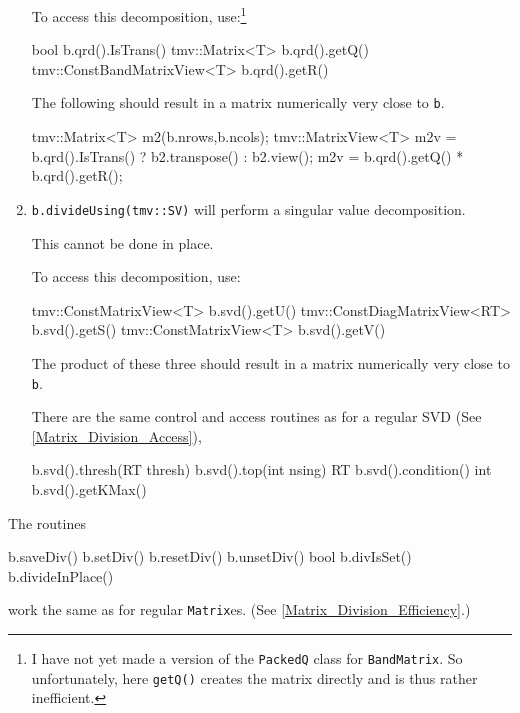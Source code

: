 \documentclass[twoside,letterpaper,11pt]{article}
\renewcommand{\tt}[1]{{\lstinline {#1}}}
\begin{document}
\begin{enumerate}
To access this decomposition, use:\footnote{
I have not yet made a version of the \tt{PackedQ} class for \tt{BandMatrix}.
So unfortunately, here \tt{getQ()} creates the matrix directly and is thus
rather inefficient.}
\begin{tmvcode}
bool b.qrd().IsTrans()
tmv::Matrix<T> b.qrd().getQ()
tmv::ConstBandMatrixView<T> b.qrd().getR()
\end{tmvcode}
The following should result in a matrix numerically very close to \tt{b}.
\begin{tmvcode}
tmv::Matrix<T> m2(b.nrows,b.ncols);
tmv::MatrixView<T> m2v = 
      b.qrd().IsTrans() ? b2.transpose() : b2.view();
m2v = b.qrd().getQ() * b.qrd().getR();
\end{tmvcode}

\item
\tt{b.divideUsing(tmv::SV)} will perform a singular value decomposition.

This cannot be done in place.

To access this decomposition, use:
\begin{tmvcode}
tmv::ConstMatrixView<T> b.svd().getU()
tmv::ConstDiagMatrixView<RT> b.svd().getS()
tmv::ConstMatrixView<T> b.svd().getV()
\end{tmvcode}
The product of these three
should result in a matrix numerically very close to \tt{b}.

There are the same control and access routines as for a regular SVD
(See \ref{Matrix_Division_Access}),
\begin{tmvcode}
b.svd().thresh(RT thresh)
b.svd().top(int nsing)
RT b.svd().condition()
int b.svd().getKMax()
\end{tmvcode}

\end{enumerate}
The routines 
\begin{tmvcode}
b.saveDiv()
b.setDiv()
b.resetDiv()
b.unsetDiv()
bool b.divIsSet()
b.divideInPlace()
\end{tmvcode}
work the same as for regular \tt{Matrix}es.
(See \ref{Matrix_Division_Efficiency}.)
\end{document}
